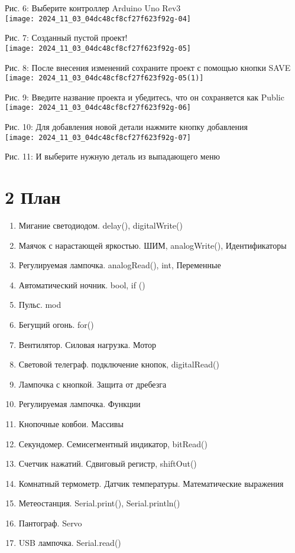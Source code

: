 \documentclass[10pt]{article}
\begin{document}
Рис. 6: Выберите контроллер Arduino Uno Rev3\\
\texttt{[image: 2024\_11\_03\_04dc48cf8cf27f623f92g-04]}

Рис. 7: Созданный пустой проект!\\
\texttt{[image: 2024\_11\_03\_04dc48cf8cf27f623f92g-05]}

Рис. 8: После внесения изменений сохраните проект с помощью кнопки SAVE\\
\texttt{[image: 2024\_11\_03\_04dc48cf8cf27f623f92g-05(1)]}

Рис. 9: Введите название проекта и убедитесь, что он сохраняется как Public\\
\texttt{[image: 2024\_11\_03\_04dc48cf8cf27f623f92g-06]}

Рис. 10: Для добавления новой детали нажмите кнопку добавления\\
\texttt{[image: 2024\_11\_03\_04dc48cf8cf27f623f92g-07]}

Рис. 11: И выберите нужную деталь из выпадающего меню

\section*{2 План}
\begin{enumerate}
  \item Мигание светодиодом. delay(), digitalWrite()
  \item Маячок с нарастающей яркостью. ШИМ, analogWrite(), Идентификаторы
  \item Регулируемая лампочка. analogRead(), int, Переменные
  \item Автоматический ночник. bool, if ()
  \item Пульс. mod
  \item Бегущий огонь. for()
  \item Вентилятор. Силовая нагрузка. Мотор
  \item Световой телеграф. подключение кнопок, digitalRead()
  \item Лампочка с кнопкой. Защита от дребезга
  \item Регулируемая лампочка. Функции
  \item Кнопочные ковбои. Массивы
  \item Секундомер. Семисегментный индикатор, bitRead()
  \item Счетчик нажатий. Сдвиговый регистр, shiftOut()
  \item Комнатный термометр. Датчик температуры. Математические выражения
  \item Метеостанция. Serial.print(), Serial.println()
  \item Пантограф. Servo
  \item USB лампочка. Serial.read()
\end{enumerate}
\end{document}
